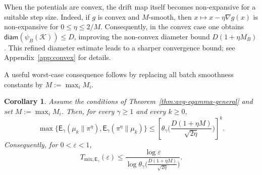\documentclass[10pt, journal]{IEEEtran}
\newtheorem{corollary}{Corollary}
\begin{document}
When the potentials are convex, the drift map itself becomes non-expansive for a suitable step size. Indeed, if $g$ is convex and $M$-smooth, then $x\mapsto x-\eta\nabla g(x)$ is non-expansive for $0\le\eta\le 2/M$. Consequently, in the convex case one obtains $\mathsf{diam}(\psi_B(\mathcal K))\le D$, improving the non-convex diameter bound $D(1+\eta M_B)$. This refined diameter estimate leads to a sharper convergence bound; see Appendix~\ref{app:convex} for details.


A useful worst-case consequence follows by replacing all batch smoothness constants by $M:=\max_i M_i$.
\begin{corollary}\label{corollary_Egamma_PLMC}
Assume the conditions of Theorem~\ref{thm:avg-egamma-general} and set $M:=\max_i M_i$. Then, for every $\gamma\ge 1$ and every $k\ge 0$,
$$\max\{\mathsf E_\gamma(\mu_k\|\pi^\eta),\mathsf E_\gamma(\pi^\eta\|\mu_k)\}\le \left[\theta_\gamma\Big(\frac{D(1+\eta M)}{\sqrt{2\eta}}\Big)\right]^k.$$
Consequently, for $0<\varepsilon<1$,
$$T_{\mathrm{mix},\mathsf E_\gamma}(\varepsilon)\le \frac{\log\varepsilon}{\log\theta_\gamma\Big(\frac{D(1+\eta M)}{\sqrt{2\eta}}\Big)}.$$
\end{corollary}

\end{document}
